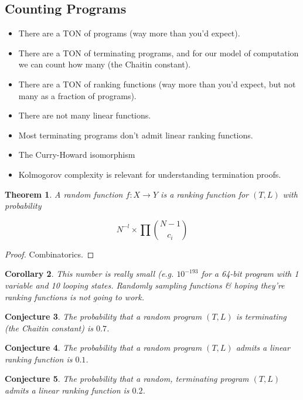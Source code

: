 \documentclass[preprint]{sigplanconf}
\newtheorem{theorem}{Theorem}
\newtheorem{corollary}[theorem]{Corollary}
\newtheorem{conjecture}[theorem]{Conjecture}
\theoremstyle{definition}
\begin{document}
\subsection{Counting Programs}
\begin{itemize}
 \item There are a TON of programs (way more than you'd expect).
 \item There are a TON of terminating programs, and for our model of computation we can count
  how many (the Chaitin constant).
 \item There are a TON of ranking functions (way more than you'd expect, but not many as a
  fraction of programs).
 \item There are not many linear functions.
 \item Most terminating programs don't admit linear ranking functions.
 \item The Curry-Howard isomorphism
 \item Kolmogorov complexity is relevant for understanding termination proofs.
\end{itemize}


\begin{theorem}
 A random function $f : X \to Y$ is a ranking function for $(T, L)$ with probability

 $$N^{-l} \times \prod {{N-1} \choose c_i}$$
\end{theorem}

\begin{proof}
 Combinatorics.
\end{proof}


\begin{corollary}
 This number is really small (e.g. $10^{-193}$ for a 64-bit program with 1 variable and 10 looping states.
 Randomly sampling functions \& hoping they're ranking functions is not going to work.
\end{corollary}


\begin{conjecture}
 The probability that a random program $(T, L)$ is terminating (the Chaitin constant)
 is $0.7$.
\end{conjecture}

\begin{conjecture}
 The probability that a random program $(T, L)$ admits a linear ranking function is
 $0.1$.
\end{conjecture}

\begin{conjecture}
 The probability that a random, terminating program $(T, L)$ admits a linear ranking function
 is $0.2$.
\end{conjecture}
\end{document}

